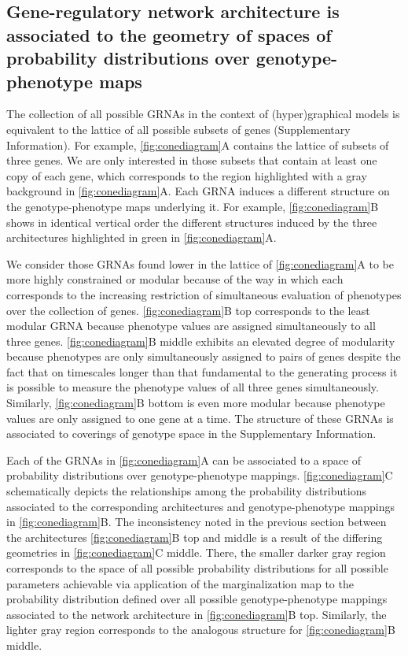\subsection{Gene-regulatory network architecture is associated to the geometry of spaces of probability distributions over genotype-phenotype maps}
The collection of all possible GRNAs in the context of (hyper)graphical models is equivalent to the lattice of all possible subsets of genes (Supplementary Information). For example, \ref{fig:conediagram}A contains the lattice of subsets of three genes. We are only interested in those subsets that contain at least one copy of each gene, which corresponds to the region highlighted with a gray background in \ref{fig:conediagram}A. Each GRNA induces a different structure on the genotype-phenotype maps underlying it. For example, \ref{fig:conediagram}B shows in identical vertical order the different structures induced by the three architectures highlighted in green in \ref{fig:conediagram}A.

We consider those GRNAs found lower in the lattice of \ref{fig:conediagram}A to be more highly constrained or modular because of the way in which each corresponds to the increasing restriction of simultaneous evaluation of phenotypes over the collection of genes. \ref{fig:conediagram}B top corresponds to the least modular GRNA because phenotype values are assigned simultaneously to all three genes. \ref{fig:conediagram}B middle exhibits an elevated degree of modularity because phenotypes are only simultaneously assigned to pairs of genes despite the fact that on timescales longer than that fundamental to the generating process it is possible to measure the phenotype values of all three genes simultaneously. Similarly, \ref{fig:conediagram}B bottom is even more modular because phenotype values are only assigned to one gene at a time. The structure of these GRNAs is associated to coverings of genotype space in the Supplementary Information.

Each of the GRNAs in \ref{fig:conediagram}A can be associated to a space of probability distributions over genotype-phenotype mappings. \ref{fig:conediagram}C schematically depicts the relationships among the probability distributions associated to the corresponding architectures and genotype-phenotype mappings in \ref{fig:conediagram}B. The inconsistency noted in the previous section between the architectures \ref{fig:conediagram}B top and middle is a result of the differing geometries in \ref{fig:conediagram}C middle. There, the smaller darker gray region corresponds to the space of all possible probability distributions for all possible parameters achievable via application of the marginalization map to the probability distribution defined over all possible genotype-phenotype mappings associated to the network architecture in \ref{fig:conediagram}B top. Similarly, the lighter gray region corresponds to the analogous structure for \ref{fig:conediagram}B middle.

